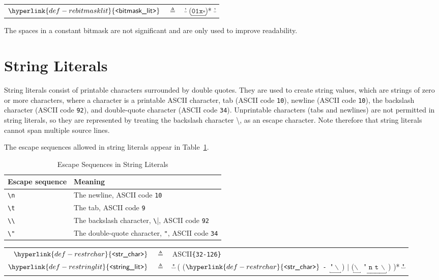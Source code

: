 \documentclass{book}
\newcommand\anycharacter[1]{$\underbracket{#1}$}
\newcommand\REstrchar[0]{\hyperlink{def-restrchar}{\texttt{<}\textsf{str\_char}\texttt{>}}}
\newcommand\REstringlit[0]{\hyperlink{def-restringlit}{\texttt{<}\textsf{string\_lit}\texttt{>}}}
\newcommand\REbitmasklit[0]{\hyperlink{def-rebitmasklit}{\texttt{<}\textsf{bitmask\_lit}\texttt{>}}}
\newcommand\ascii[1]{\textsf{ASCII}\texttt{\{#1\}}}
\begin{document}
\hypertarget{def-rebitmasklit}{}
\begin{center}
\begin{tabular}{rcl}
$\REbitmasklit$ &$\triangleq$& \anycharacter{\texttt{'}} (\anycharacter{\texttt{01x}\square})* \anycharacter{\texttt{'}}
\end{tabular}
\end{center}

The spaces in a constant bitmask are not significant and are only used to improve readability.

\section{String Literals}

String literals consist of printable characters surrounded by double quotes.
They are used to create string values, which are strings of zero or more characters,
where a character is a printable ASCII character,
tab (ASCII code \texttt{10}),
newline (ASCII code \texttt{10}),
the backslash character (ASCII code \texttt{92}),
and double-quote character (ASCII code \texttt{34}).
Unprintable characters (tabs and newlines) are not permitted in string literals,
so they are represented by treating the backslash character \textbackslash, as an escape character.
Note therefore that string literals cannot span multiple source lines.

The escape sequences allowed in string literals appear in Table~\ref{ta:SscapeSeuqnces}.
\begin{table}
\caption{Escape Sequences in String Literals\label{ta:SscapeSeuqnces}}
\begin{center}
\begin{tabular}{ll}
\hline
\textbf{Escape sequence} & \textbf{Meaning}\\
\hline
\verb|\n| & The newline, ASCII code \texttt{10}\\
\verb|\t| & The tab, ASCII code \texttt{9}\\
\verb|\\| & The backslash character, \verb|\|, ASCII code \texttt{92}\\
\verb|\"| & The double-quote character, \texttt{"}, ASCII code \texttt{34}\\
\hline
\end{tabular}
\end{center}
\end{table}

\hypertarget{def-restringlit}{}
\hypertarget{def-restrchar}{}
\begin{center}
\begin{tabular}{rcl}
$\REstrchar$ &$\triangleq$& \ascii{32-126}\\
$\REstringlit$ &$\triangleq$& \anycharacter{\texttt{"}} ( ($\REstrchar$ \texttt{-} $\underbracket{\texttt{"}\ \backslash\ }$) $|$ ($\underbracket{\backslash\ }$ $\underbracket{\texttt{" n t }\backslash\ }$)  )* \anycharacter{\texttt{"}}
\end{tabular}
\end{center}
\end{document}
